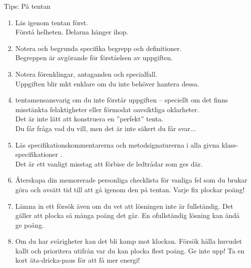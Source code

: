 \begin{Slide}{Tips: På tentan} \SlideFontTiny
\begin{enumerate}
\item Läs igenom  tentan först. \\  Förstå helheten. Delarna hänger ihop.
\item Notera och begrunda specifika begrepp och definitioner. \\  Begreppen är avgörande för förståelsen av uppgiften.
\item Notera förenklingar, antaganden och specialfall. \\  Uppgiften blir mkt enklare om du inte behöver hantera dessa.
\item {} tentamensansvarig om du inte förstår uppgiften -- speciellt om det finns misstänkta felaktigheter eller förmodat oavsiktliga oklarheter. \\  Det är inte lätt att konstruera en ''perfekt'' tenta. \\ Du får fråga vad du vill, men det är inte säkert du får svar...
\item Läs specifikationskommentarerna och metodsignaturerna i alla givna klass-specifikationer . \\  Det är ett vanligt misstag att förbise de ledtrådar som ges där.
\item Återskapa din memorerade personliga checklista för vanliga fel som du brukar göra och avsätt tid till att gå igenom den på tentan. Varje fix plockar poäng!
\item Lämna in ett försök även om du vet att lösningen inte är fullständig. Det gäller att plocka så många poäng det går. En ofullständig lösning kan ändå ge poäng.

\item Om du har svårigheter kan det bli kamp mot klockan. Försök hålla huvudet kallt och prioritera utifrån var du kan plocka flest poäng. Ge inte upp! Ta en kort äta-dricka-paus för att få mer energi!

\end{enumerate}
\end{Slide}

